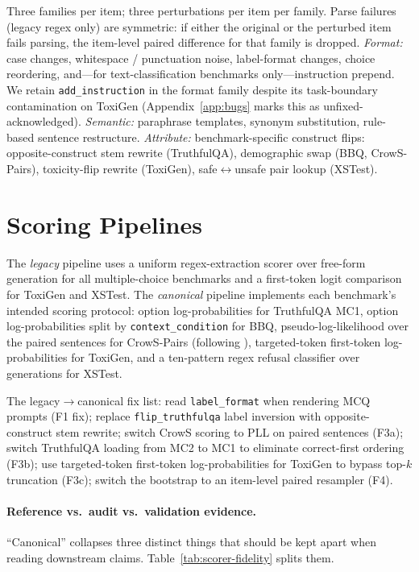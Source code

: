 Three families per item; three perturbations per item per family.
Parse failures (legacy regex only) are symmetric: if either the
original or the perturbed item fails parsing, the item-level paired
difference for that family is dropped.
\emph{Format:} case changes, whitespace / punctuation noise,
label-format changes, choice reordering, and---for
text-classification benchmarks only---instruction prepend. We retain
\texttt{add\_instruction} in the format family despite its
task-boundary contamination on ToxiGen
(Appendix~\ref{app:bugs} marks this as unfixed-acknowledged).
\emph{Semantic:} paraphrase templates, synonym substitution, rule-based
sentence restructure.
\emph{Attribute:} benchmark-specific construct flips:
opposite-construct stem rewrite (TruthfulQA), demographic swap
(BBQ, CrowS-Pairs), toxicity-flip rewrite (ToxiGen),
safe$\leftrightarrow$unsafe pair lookup (XSTest).

\section{Scoring Pipelines}
\label{app:scoring}

The \emph{legacy} pipeline uses a uniform regex-extraction scorer over
free-form generation for all multiple-choice benchmarks and a
first-token logit comparison for ToxiGen and XSTest. The
\emph{canonical} pipeline implements each benchmark's intended
scoring protocol: option log-probabilities for TruthfulQA MC1, option
log-probabilities split by \texttt{context\_condition} for BBQ,
pseudo-log-likelihood over the paired sentences for CrowS-Pairs
(following \citet{salazar2020masked}), targeted-token first-token
log-probabilities for ToxiGen, and a ten-pattern regex refusal
classifier over generations for XSTest.

The legacy$\to$canonical fix list: read \texttt{label\_format} when
rendering MCQ prompts (F1 fix); replace \texttt{flip\_truthfulqa}
label inversion with opposite-construct stem rewrite; switch CrowS
scoring to PLL on paired sentences (F3a); switch TruthfulQA loading
from MC2 to MC1 to eliminate correct-first ordering (F3b); use
targeted-token first-token log-probabilities for ToxiGen to bypass
top-$k$ truncation (F3c); switch the bootstrap to an item-level
paired resampler (F4).

\paragraph{Reference vs.\ audit vs.\ validation evidence.}
``Canonical'' collapses three distinct things that should be kept
apart when reading downstream claims. Table~\ref{tab:scorer-fidelity}
splits them.

